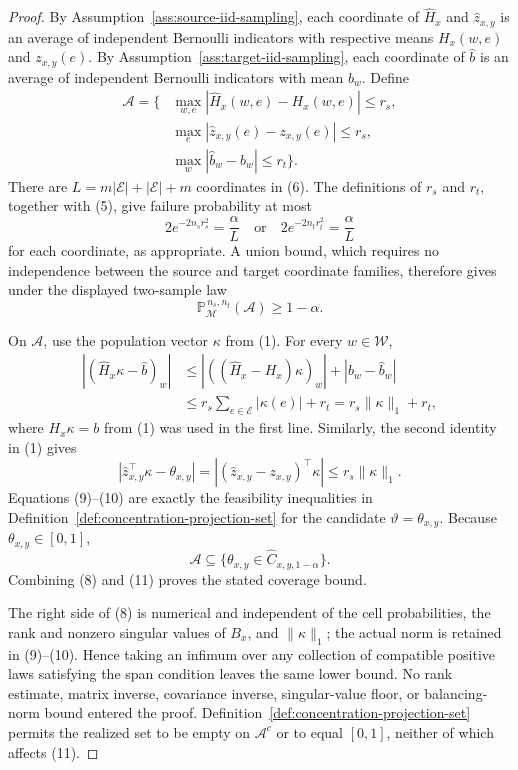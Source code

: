 \documentclass{article}
\begin{document}
\begin{proof}
By Assumption~\ref{ass:source-iid-sampling}, each coordinate of \(\widehat H_x\) and \(\widehat z_{x,y}\) is an average of independent Bernoulli indicators with respective means \(H_x(w,e)\) and \(z_{x,y}(e)\). By Assumption~\ref{ass:target-iid-sampling}, each coordinate of \(\widehat b\) is an average of independent Bernoulli indicators with mean \(b_w\). Define
\[
\begin{aligned}
\mathcal A=\{&\max_{w,e}|\widehat H_x(w,e)-H_x(w,e)|\le r_s,\\
&\max_e|\widehat z_{x,y}(e)-z_{x,y}(e)|\le r_s,\\
&\max_w|\widehat b_w-b_w|\le r_t\}.
\end{aligned}
\tag{6}
\]
There are \(L=m\lvert\mathcal E\rvert+\lvert\mathcal E\rvert+m\) coordinates in (6). The definitions of \(r_s\) and \(r_t\), together with (5), give failure probability at most
\[
2e^{-2n_s r_s^2}=\frac{\alpha}{L}
\quad\text{or}\quad
2e^{-2n_t r_t^2}=\frac{\alpha}{L}
\tag{7}
\]
for each coordinate, as appropriate. A union bound, which requires no independence between the source and target coordinate families, therefore gives under the displayed two-sample law
\[
\mathbb P_{\mathcal M}^{\,n_s,n_t}(\mathcal A)\ge1-\alpha.
\tag{8}
\]

On \(\mathcal A\), use the population vector \(\kappa\) from (1). For every \(w\in\mathcal W\),
\[
\begin{aligned}
| (\widehat H_x\kappa-\widehat b)_w |
&\le |((\widehat H_x-H_x)\kappa)_w|+|b_w-\widehat b_w|\\
&\le r_s\sum_{e\in\mathcal E}|\kappa(e)|+r_t
=r_s\lVert\kappa\rVert_1+r_t,
\end{aligned}
\tag{9}
\]
where \(H_x\kappa=b\) from (1) was used in the first line. Similarly, the second identity in (1) gives
\[
|\widehat z_{x,y}^{\top}\kappa-\theta_{x,y}|
=| (\widehat z_{x,y}-z_{x,y})^{\top}\kappa |
\le r_s\lVert\kappa\rVert_1.
\tag{10}
\]
Equations (9)--(10) are exactly the feasibility inequalities in Definition~\ref{def:concentration-projection-set} for the candidate \(\vartheta=\theta_{x,y}\). Because \(\theta_{x,y}\in[0,1]\),
\[
\mathcal A\subseteq
\{\theta_{x,y}\in\widehat C_{x,y,1-\alpha}\}.
\tag{11}
\]
Combining (8) and (11) proves the stated coverage bound.

The right side of (8) is numerical and independent of the cell probabilities, the rank and nonzero singular values of \(B_x\), and \(\lVert\kappa\rVert_1\); the actual norm is retained in (9)--(10). Hence taking an infimum over any collection of compatible positive laws satisfying the span condition leaves the same lower bound. No rank estimate, matrix inverse, covariance inverse, singular-value floor, or balancing-norm bound entered the proof. Definition~\ref{def:concentration-projection-set} permits the realized set to be empty on \(\mathcal A^c\) or to equal \([0,1]\), neither of which affects (11).
\end{proof}
\end{document}
